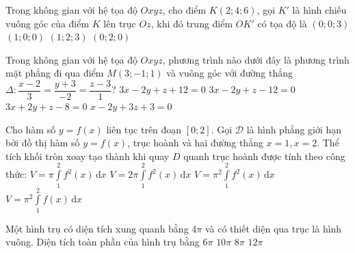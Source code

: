 \begin{ex}%
Trong không gian với hệ tọa độ $Oxyz$, cho điểm $K\left(2;4;6\right)$, gọi $K'$ là hình chiếu vuông góc của điểm $K$ lên trục $Oz$, khi đó trung điểm $OK'$ có tọa độ là
\choice
{\True $\left(0;0;3\right)$}
{$\left(1;0;0\right)$}
{$\left(1;2;3\right)$}
{$\left(0;2;0\right)$}
\end{ex}\begin{ex}%
Trong không gian với hệ tọa độ $Oxyz$, phương trình nào dưới đây là phương trình mặt phẳng đi qua điểm $M\left(3;-1;1\right)$ và vuông góc với đường thẳng $\Delta \colon \dfrac{x - 2}{3} = \dfrac{y + 3}{-2} = \dfrac{z - 3}{1}$?
\choice
{$3x - 2y + z + 12 = 0$}
{\True $3x - 2y + z - 12 = 0$}
{$3x + 2y + z - 8 = 0$}
{$x - 2y + 3z + 3 = 0$}
\end{ex}\begin{ex}%
Cho hàm số $y = f\left(x\right)$ liên tục trên đoạn $\left[0;2\right]$. Gọi $\mathscr{D}$ là hình phẳng giới hạn bởi đồ thị hàm số $y = f\left(x\right)$, trục hoành và hai đường thẳng $x = 1, x = 2$. Thể tích khối tròn xoay tạo thành khi quay $D$ quanh trục hoành được tính theo công thức:
\choice
{\True $V = \pi\displaystyle\int\limits_1^2 f^2\left(x\right)\mathrm{\,d}x$}
{$V = 2\pi\displaystyle\int\limits_1^2 f^2\left(x\right)\mathrm{\,d}x$}
{$V = \pi^2\displaystyle\int\limits_1^2 f^2\left(x\right)\mathrm{\,d}x$}
{$V = \pi^2\displaystyle\int\limits_1^2 f\left(x\right)\mathrm{\,d}x$}
\end{ex}\begin{ex}%
Một hình trụ có diện tích xung quanh bằng $4\pi$ và có thiết diện qua trục là hình vuông. Diện tích toàn phần của hình trụ bằng
\choice
{\True $6\pi$}
{$10\pi$}
{$8\pi$}
{$12\pi$}
\end{ex}
